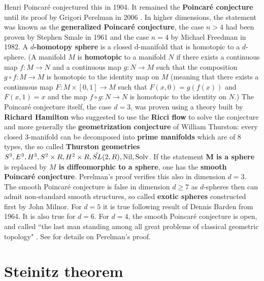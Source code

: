 \documentclass[12pt]{amsart}
\begin{document}
Henri Poincar\'e conjectured this in 1904. It remained the {\bf Poincar\'e conjecture}
until its proof by Grigori Perelman in 2006  \cite{Morgan2007}.
In higher dimensions, the statement was known
as the {\bf generalized Poincar\'e conjecture}, the case $n>4$ had been proven by
Stephen Smale in 1961 and the case $n=4$ by Michael Freedman in 1982.
A {\bf $d$-homotopy sphere} is a closed d-manifold that is homotopic to a $d$-sphere.
(A manifold $M$ is {\bf homotopic} to a manifold $N$ if there exists a continuous
map $f: M \to N$ and a continuous map $g: N \to M$ such that the composition
$g \circ f: M \to M$ is homotopic to the identity map on $M$ (meaning that
there exists a continuous map $F:M \times [0,1] \to M$ such that $F(x,0)=g(f(x))$ and
$F(x,1) = x$ and the map $f \circ g: N \to N$ is homotopic to the identity
on $N$.) The Poincar\'e conjecture itself, the case $d=3$,
was proven using a theory built by {\bf Richard Hamilton} who suggested to use the
{\bf Ricci flow} to solve the conjecture and more generally the
{\bf geometrization conjecture} of William Thurston: every closed 3-manifold can
be decomposed into {\bf prime manifolds} which are of 8 types, the so called
{\bf Thurston geometries} 
$S^3,E^3,H^3,S^2 \times R,H^2 \times R,\tilde{SL}(2,R),{\rm Nil},{\rm Solv}$.
If the statement {\bf M is a sphere} is replaced by 
{\bf $M$ is diffeomorphic to a sphere}, one has the 
{\bf smooth Poincar\'e conjecture}. Perelman's proof verifies this also
in dimension $d=3$. The smooth Poincar\'e conjecture is false in dimension
$d \geq 7$ as $d$-spheres then can admit non-standard smooth structures, so
called {\bf exotic spheres} constructed first by John Milnor. 
For $d=5$ it is true following result of Dennis Barden from 1964. 
It is also true for $d=6$. For $d=4$, the smooth Poincar\'e conjecture is open, and called 
``the last man standing among all great problems of classical geometric topology" \cite{FGMW}.
See \cite{MorganTian} for details on Perelman's proof.

\section{Steinitz theorem}
\end{document}
